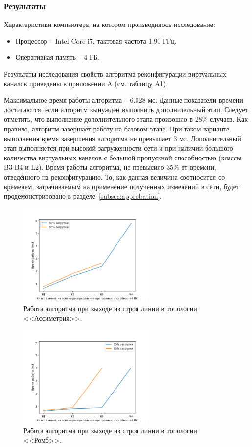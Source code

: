 \documentclass[12pt, a4paper]{article}
\begin{document}
\subsubsection{Результаты}
Характеристики компьютера, на котором производилось исследование:
\begin{itemize}
	\item Процессор -- Intel Core i7, тактовая частота 1.90 ГГц.
	\item Оперативная память -- 4 ГБ.
\end{itemize}

Результаты исследования свойств алгоритма реконфигурации виртуальных каналов приведены в приложении A (см. таблицу A1).

Максимальное время работы алгоритма – 6.028 мс. Данные показатели времени достигаются, если алгоритм вынужден выполнить дополнительный этап. Следует отметить, что выполнение дополнительного этапа произошло в 28\% случаев. Как правило, алгоритм завершает работу на базовом этапе. При таком варианте выполнения время завершения алгоритма не превышает 3 мс. Дополнительный этап выполняется при высокой загруженности сети и при наличии большого количества виртуальных каналов с большой пропускной способностью (классы B3-B4 и L2). Время работы алгоритма, не превысило 35\% от времени, отведённого на реконфигурацию. То, как данная величина соотносится со временем, затрачиваемым на применение полученных изменений в сети, будет продемонстрировано в разделе~\ref{subsec:approbation}.

\begin{figure}[h!]
	\centering
	\includegraphics[width=0.60\textwidth]{img/5node_res.png}
	\caption{Работа алгоритма при выходе из строя линии в топологии <<Ассиметрия>>.}
	\label{pic:5node_res}
\end{figure}

\begin{figure}[h!]
	\centering
	\includegraphics[width=0.60\textwidth]{img/4node_res.png}
	\caption{Работа алгоритма при выходе из строя линии в топологии <<Ромб>>.}
	\label{pic:4node_res}
\end{figure}
\end{document}

